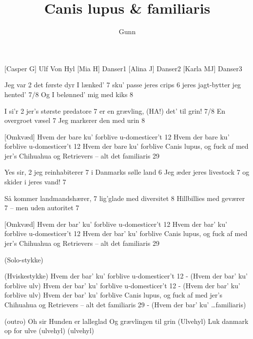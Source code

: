 \documentclass[a4paper,11pt]{article}
\title{Canis lupus \& familiaris}
\author{Gunn}
\begin{document}
\maketitle

\begin{roles}
[Casper G] Ulf Von Hyl
[Mia H] Danser1
[Alina J] Danser2
[Karla MJ] Danser3
\end{roles}

\begin{song}
 


 Jeg var 2
det første dyr I lænked' 7
sku' passe jeres crips 6
jeres jagt-bytter jeg hented' 7/8
Og I belønned' mig med kiks 8

I si'r 2
jer's største predatore 7
er en grævling, (HA!) det' til grin! 7/8
En overgroet væsel 7
Jeg markerer den med urin 8

 [Omkvæd]
Hvem der bare ku' forblive u-domesticer’t	12
Hvem der bare ku' forblive u-domesticer’t	12
Hvem der bare ku' forblive Canis lupus, 
og fuck af med jer's Chihuahua og Retrievers 
 – alt det familiaris		29

Yes sir,		2
jeg reinhabiterer	7
i Danmarks sølle land	6
Jeg æder jeres livestock	7
og skider i jeres vand!	7

Så kommer landmandshærer,	7
lig'glade med diversitet	8
Hillbillies med geværer	7
 – men uden autoritet	7

 [Omkvæd]
Hvem der bar' ku' forblive u-domesticer't	12
Hvem der bar' ku' forblive u-domesticer't	12
Hvem der bar' ku' forblive Canis lupus, 
og fuck af med jer’s Chihuahua og Retrievers
 – alt det familiaris		29
 
(Solo-stykke)

(Hviskestykke)
Hvem der bar' ku' forblive u-domesticer't	12
- (Hvem der bar' ku' forblive ulv)
Hvem der bar' ku' forblive u-domesticer't	12
- (Hvem der bar' ku' forblive ulv)
Hvem der bar' ku' forblive Canis lupus, 
og fuck af med jer’s Chihuahua og Retrievers
 – alt det familiaris		29
- (Hvem der bar' ku' \ldots familiaris)

(outro)
Oh sir
Hunden er lalleglad
Og grævlingen til grin
(Ulvehyl)
Luk danmark op for ulve
(ulvehyl)
(ulvehyl)

\end{song}
\end{document}
